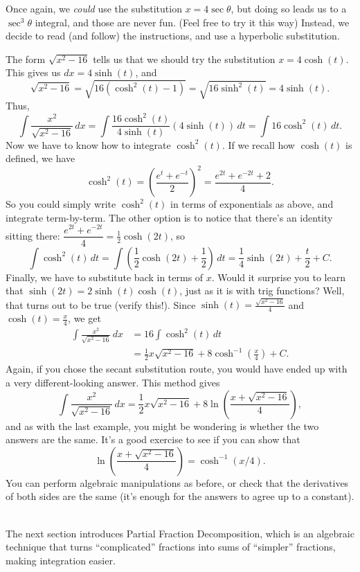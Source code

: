 {Once again, we \textit{could} use the substitution $x=4\sec\theta$, but doing so leads us to a $\sec^3\theta$ integral, and those are never fun. (Feel free to try it this way) Instead, we decide to read (and follow) the instructions, and use a hyperbolic substitution.

The form $\sqrt{x^2-16}$ tells us that we should try the substitution $x=4\cosh(t)$.  This gives us $dx = 4\sinh(t)$, and
 \[
 \sqrt{x^2-16} = \sqrt{16(\cosh^2(t)-1)} = \sqrt{16\sinh^2(t)} = 4\sinh(t).
 \]
 Thus,
 \[
 \int \frac{x^2}{\sqrt{x^2-16}}\,dx = \int \frac{16\cosh^2(t)}{4\sinh(t)}(4\sinh(t))\,dt = \int 16\cosh^2(t)\,dt.
 \]
 Now we have to know how to integrate $\cosh^2(t)$. If we recall how $\cosh(t)$ is defined, we have
 \[
 \cosh^2(t) = \left(\frac{e^t+e^{-t}}{2}\right)^2 = \frac{e^{2t}+e^{-2t}+2}{4}.
 \]
 So you could simply write $\cosh^2(t)$ in terms of exponentials as above, and integrate term-by-term. The other option is to notice that there's an identity sitting there: $\dfrac{e^{2t}+e^{-2t}}{4} = \frac{1}{2}\cosh(2t)$, so
 \[
 \int \cosh^2(t)\,dt = \int\left( \frac{1}{2}\cosh(2t)+\frac{1}{2}\right)\,dt = \frac{1}{4}\sinh(2t)+\frac{t}{2}+C.
 \]
 Finally, we have to substitute back in terms of $x$. Would it surprise you to learn that $\sinh(2t)=2\sinh(t)\cosh(t)$, just as it is with trig functions? Well, that turns out to be true (verify this!). Since $\sinh(t) = \frac{\sqrt{x^2-16}}{4}$ and $\cosh(t) = \frac{x}{4}$, we get
 \begin{align*}
 \int \frac{x^2}{\sqrt{x^2-16}}\,dx & =  16\int\cosh^2(t)\,dt\\
 & = \frac{1}{2}x\sqrt{x^2-16}+8\cosh^{-1}\left(\frac{x}{4}\right)+C.
 \end{align*}
 Again, if you chose the secant substitution route, you would have ended up with a very different-looking answer. This method gives
 \[
 \int\frac{x^2}{\sqrt{x^2-16}}\,dx = \frac{1}{2}x\sqrt{x^2-16}+8\ln\left(\frac{x+\sqrt{x^2-16}}{4}\right),
 \]
and as with the last example, you might be wondering is whether the two answers are the same.  It's a good exercise to see if you can show that
 \[
 \ln\left(\frac{x+\sqrt{x^2-16}}{4}\right) = \cosh^{-1}(x/4).
 \]
You can perform algebraic manipulations as before, or check that the derivatives of both sides are the same (it's enough for the answers to agree up to a constant).
}\\

The next section introduces Partial Fraction Decomposition, which is an algebraic technique that turns ``complicated'' fractions into sums of ``simpler'' fractions, making integration easier.





